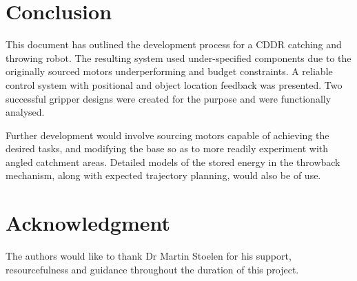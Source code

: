 \documentclass[conference]{IEEEtran}
\begin{document}
\section{Conclusion}
This document has outlined the development process for a CDDR catching and throwing robot. The resulting system used under-specified components due to the originally sourced motors underperforming and budget constraints. A reliable control system with positional and object location feedback was presented. Two successful gripper designs were created for the purpose and were functionally analysed.

Further development would involve sourcing motors capable of achieving the desired tasks, and modifying the base so as to more readily experiment with angled catchment areas. Detailed models of the stored energy in the throwback mechanism, along with expected trajectory planning, would also be of use.



\section*{Acknowledgment}


The authors would like to thank Dr Martin Stoelen for his support, resourcefulness and guidance throughout the duration of this project.


	
	
	
	
	
	{}
	
	

	
	
\end{document}
